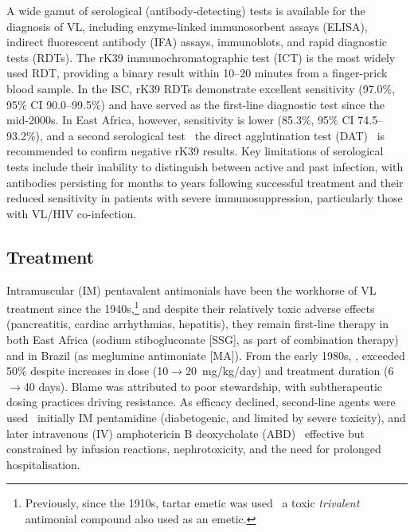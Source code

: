 A wide gamut of serological (antibody-detecting) tests is available for the diagnosis of VL, including enzyme-linked immunosorbent assays (ELISA), indirect fluorescent antibody (IFA) assays, immunoblots, and rapid diagnostic tests (RDTs)\cite{farrar2023manson}. The rK39 immunochromatographic test (ICT) is the most widely used RDT, providing a binary result within 10--20 minutes from a finger-prick blood sample. In the ISC, rK39 RDTs demonstrate excellent sensitivity (97.0\%, 95\% CI 90.0--99.5\%)\cite{boelaert2014} and have served as the first-line diagnostic test since the mid-2000s. In East Africa, however, sensitivity is lower (85.3\%, 95\% CI 74.5--93.2\%), and a second serological test \textemdash\  the direct agglutination test (DAT) \textemdash\  is recommended to confirm negative rK39 results\cite{boelaert2014}. Key limitations of serological tests include their inability to distinguish between active and past infection, with antibodies persisting for months to years following successful treatment and their reduced sensitivity in patients with severe immunosuppression, particularly those with VL/HIV co-infection\cite{burza2018}.


\subsection{Treatment}

Intramuscular (IM) pentavalent antimonials have been the workhorse of VL treatment since the 1940s,\footnote{Previously, since the 1910s, tartar emetic was used \textemdash\ a toxic \textit{trivalent} antimonial compound also used as an emetic.} and despite their relatively toxic adverse effects (pancreatitis, cardiac arrhythmias, hepatitis), they remain first-line therapy in both East Africa (sodium stibogluconate [SSG], as part of combination therapy) and in Brazil (as meglumine antimoniate [MA])\cite{WHO_TRS_949_2010,Brasil_2024_GuiaVigilanciaSaude}. From the early 1980s, , exceeded 50\% despite increases in dose (10$\rightarrow$20~mg/kg/day) and treatment duration (6$\rightarrow$40 days). Blame was attributed to poor stewardship, with subtherapeutic dosing practices driving resistance\cite{sundar2001}. As efficacy declined, second-line agents were used \textemdash\ initially IM pentamidine (diabetogenic, and limited by severe toxicity), and later intravenous (IV) amphotericin B deoxycholate (ABD) \textemdash\ effective but constrained by infusion reactions, nephrotoxicity, and the need for prolonged hospitalisation.

